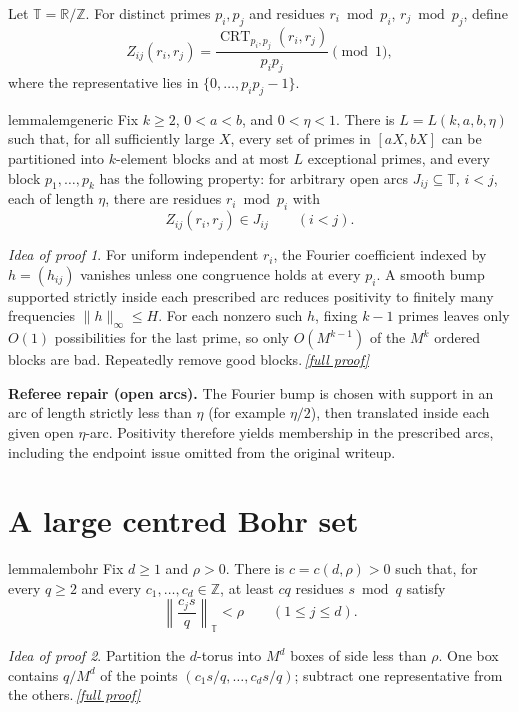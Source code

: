 \documentclass[11pt,a4paper]{article}
\theoremstyle{plain}
\theoremstyle{definition}
\theoremstyle{remark}
\newtheorem*{proofidea}{Idea of proof}
\newcommand{\fullproofref}[1]{\,\hyperref[#1]{\textit{[full proof]}}}
\newcommand{\T}{\mathbb T}
\newcommand{\norm}[1]{\left\lVert #1\right\rVert_{\T}}
\newcommand{\CRT}{\operatorname{CRT}}
\begin{document}
Let $\T=\mathbb R/\mathbb Z$. For distinct primes $p_i,p_j$ and residues $r_i\bmod p_i$, $r_j\bmod p_j$, define
\[
 Z_{ij}(r_i,r_j)=
 \frac{\CRT_{p_i,p_j}(r_i,r_j)}{p_ip_j}\pmod1,
\tag{4.1}
\]
where the representative lies in $\{0,\ldots,p_ip_j-1\}$.

\begin{restatable}{lemma}{lemgeneric}\label{lem:generic}
Fix $k\ge2$, $0<a<b$, and $0<\eta<1$. There is $L=L(k,a,b,\eta)$ such that, for all sufficiently large $X$, every set of primes in $[aX,bX]$ can be partitioned into $k$-element blocks and at most $L$ exceptional primes, and every block $p_1,\ldots,p_k$ has the following property: for arbitrary open arcs $J_{ij}\subseteq\T$, $i<j$, each of length $\eta$, there are residues $r_i\bmod p_i$ with
\[
 Z_{ij}(r_i,r_j)\in J_{ij}\qquad(i<j).
\tag{4.2}
\]
\end{restatable}
\begin{proofidea}
For uniform independent $r_i$, the Fourier coefficient indexed by $h=(h_{ij})$ vanishes unless one congruence holds at every $p_i$. A smooth bump supported strictly inside each prescribed arc reduces positivity to finitely many frequencies $\|h\|_\infty\le H$. For each nonzero such $h$, fixing $k-1$ primes leaves only $O(1)$ possibilities for the last prime, so only $O(M^{k-1})$ of the $M^k$ ordered blocks are bad. Repeatedly remove good blocks.\fullproofref{pf:generic}
\end{proofidea}

\begin{repairbox}
\textbf{Referee repair (open arcs).} The Fourier bump is chosen with support in an arc of length strictly less than $\eta$ (for example $\eta/2$), then translated inside each given open $\eta$-arc. Positivity therefore yields membership in the prescribed arcs, including the endpoint issue omitted from the original writeup.
\end{repairbox}

\section{A large centred Bohr set}\label{sec:bohr}

\begin{restatable}{lemma}{lembohr}\label{lem:bohr}
Fix $d\ge1$ and $\rho>0$. There is $c=c(d,\rho)>0$ such that, for every $q\ge2$ and every $c_1,\ldots,c_d\in\mathbb Z$, at least $cq$ residues $s\bmod q$ satisfy
\[
 \norm{\frac{c_js}{q}}<\rho\qquad(1\le j\le d).
\tag{5.1}\label{eq:bohr-condition}
\]
\end{restatable}
\begin{proofidea}
Partition the $d$-torus into $M^d$ boxes of side less than $\rho$. One box contains $q/M^d$ of the points $(c_1s/q,\ldots,c_ds/q)$; subtract one representative from the others.\fullproofref{pf:bohr}
\end{proofidea}
\end{document}
